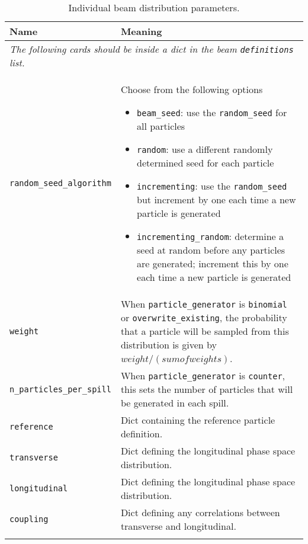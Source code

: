 \begin{table*}
\begin{center}
\caption{Individual beam distribution parameters.}
\begin{tabularx}{\linewidth}{lX}
Name & Meaning \\
\hline
\multicolumn{2}{l}{\emph{The following cards should be inside a dict in the beam \verb|definitions| list.}} \\
\hline
\verb|random_seed_algorithm| & Choose from the following options
                          \begin{itemize}
                            \setlength{\itemsep}{0mm}
                            \item \verb|beam_seed|: use the \verb|random_seed| for all particles
                            \item \verb|random|: use a different randomly determined seed for each particle
                            \item \verb|incrementing|: use the \verb|random_seed| but increment by one each time a new particle is generated
                            \item \verb|incrementing_random|: determine a seed at random before any particles are generated; increment this by one each time a new particle is generated
                          \end{itemize}\\
\verb|weight| & When \verb|particle_generator| is \verb|binomial| or \verb|overwrite_existing|, the probability that a particle will be sampled from this distribution is given by $weight/(sumofweights)$.\\
\verb|n_particles_per_spill| & When \verb|particle_generator| is \verb|counter|, this sets the number of particles that will be generated in each spill. \\
\verb|reference| & Dict containing the reference particle definition. \\
\verb|transverse| & Dict defining the longitudinal phase space distribution. \\
\verb|longitudinal| & Dict defining the longitudinal phase space distribution. \\
\verb|coupling| & Dict defining any correlations between transverse and longitudinal. \\
\begin{makeimage} %
\end{makeimage} 
\end{tabularx}
\end{center}
\end{table*}

